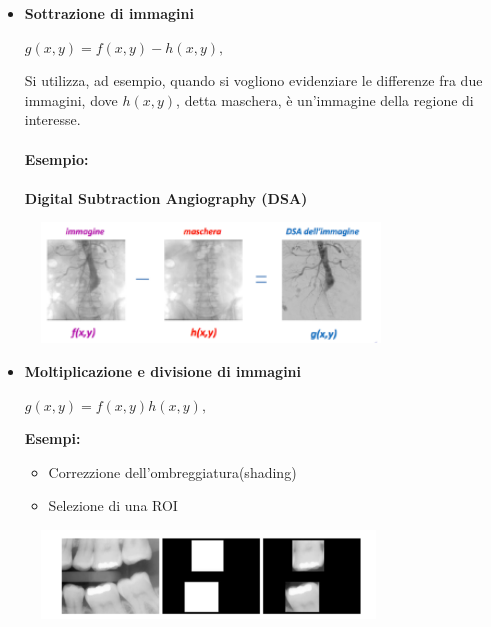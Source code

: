 \begin{itemize}
    \item \textbf{Sottrazione di immagini}
          \begin{center}
              $g(x,y) = f(x,y)-h(x,y),$
          \end{center}
          Si utilizza, ad esempio, quando si vogliono evidenziare le differenze fra due immagini,
          dove $h(x,y)$, detta maschera, è un'immagine della regione di interesse.
          \\\\ \textbf{Esempio:}
          \\\\ \textbf{Digital Subtraction Angiography (DSA)}
\end{itemize}

\begin{figure}[H]
    \centering
    \includegraphics[width=9cm, keepaspectratio]{capitoli/immagini/imgs/sottrazione.png}
\end{figure}


\begin{itemize}
    \item \textbf{Moltiplicazione e divisione di immagini}
          \begin{center}
              $g(x,y) = f(x,y)h(x,y),$
          \end{center}
          \textbf{Esempi:}
          \begin{itemize}
              \item Correzzione dell'ombreggiatura(shading)
              \item Selezione di una ROI
          \end{itemize}
\end{itemize}

\begin{figure}[H]
    \centering
    \includegraphics[width=\linewidth, keepaspectratio]{capitoli/immagini/imgs/moltiplicazione.png}
\end{figure}

